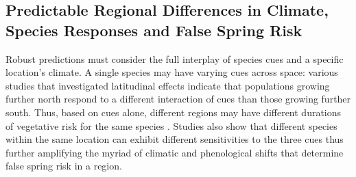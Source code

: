 \documentclass{article}\usepackage[]{graphicx}\usepackage[]{color}
\begin{document}



\subsection {Predictable Regional Differences in Climate, Species Responses and False Spring Risk}
Robust predictions must consider the full interplay of species cues and a specific location's climate. A single species may have varying cues across space: various studies that investigated latitudinal effects indicate that populations growing further north respond to a different interaction of cues than those growing further south. Thus, based on cues alone, different regions may have different durations of vegetative risk for the same species \citep {Partanen2004, Viheraaarnio2006, Caffarra2011}. Studies also show that different species within the same location can exhibit different sensitivities to the three cues \citep{Basler2012, Laube2013} thus further amplifying the myriad of climatic and phenological shifts that determine false spring risk in a region. %
\end{document}
